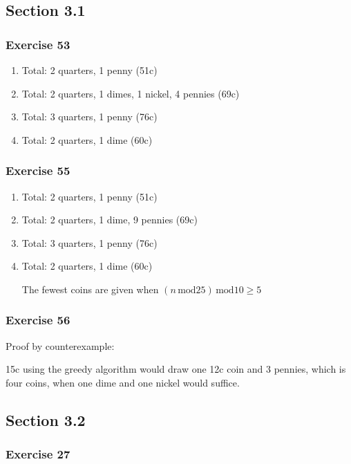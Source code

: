 \documentclass[a4paper]{article}
\newcommand{\ex}[1]{\subsubsection*{#1}}
\begin{document}
\pagestyle{fancy} %



\subsection*{Section 3.1}
\ex{Exercise 53}

\begin{enumerate}[label=\alph*)]
    \item Total: 2 quarters, 1 penny (51c)

    \item Total: 2 quarters, 1 dimes, 1 nickel, 4 pennies (69c)

    \item Total: 3 quarters, 1 penny (76c)

    \item Total: 2 quarters, 1 dime (60c)
\end{enumerate}


\ex{Exercise 55}

\begin{enumerate}[label=\alph*)]
    \item Total: 2 quarters, 1 penny (51c)

    \item Total: 2 quarters, 1 dime, 9 pennies (69c)

    \item Total: 3 quarters, 1 penny (76c)

    \item Total: 2 quarters, 1 dime (60c)

        The fewest coins are given when \((n \, \mathrm{mod}25) \, \mathrm{mod} 10 \geq 5\)

\end{enumerate}


\ex{Exercise 56}

Proof by counterexample:

15c using the greedy algorithm would draw one 12c coin and 3 pennies, which is four coins, when one dime and one nickel would suffice. 


\vspace{1em}
\subsection*{Section 3.2}
\ex{Exercise 27}
\end{document}
